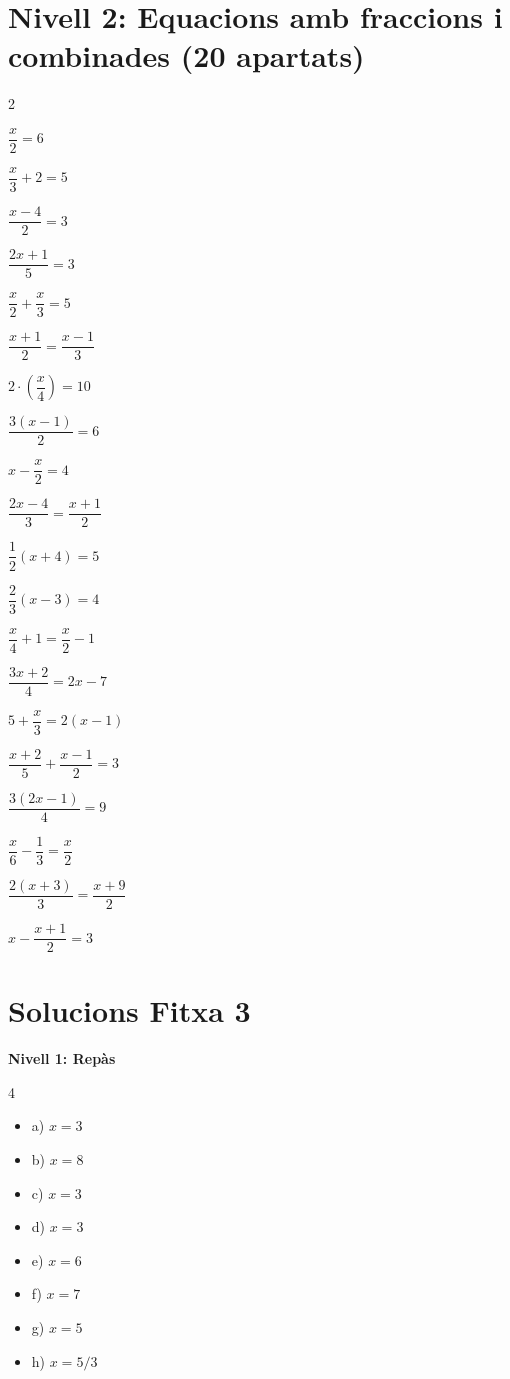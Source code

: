 \documentclass[12pt,a4paper]{article}
\begin{document}
\section*{Nivell 2: Equacions amb fraccions i combinades (20 apartats)}
\begin{multicols}{2}
\begin{exercicis}
    \item $\dfrac{x}{2} = 6$
    \item $\dfrac{x}{3} + 2 = 5$
    \item $\dfrac{x-4}{2} = 3$
    \item $\dfrac{2x+1}{5} = 3$
    \item $\dfrac{x}{2} + \dfrac{x}{3} = 5$
    \item $\dfrac{x+1}{2} = \dfrac{x-1}{3}$
    \item $2 \cdot \left( \dfrac{x}{4} \right) = 10$
    \item $\dfrac{3(x-1)}{2} = 6$
    \item $x - \dfrac{x}{2} = 4$
    \item $\dfrac{2x-4}{3} = \dfrac{x+1}{2}$
    \item $\dfrac{1}{2}(x+4) = 5$
    \item $\dfrac{2}{3}(x-3) = 4$
    \item $\dfrac{x}{4} + 1 = \dfrac{x}{2} - 1$
    \item $\dfrac{3x+2}{4} = 2x - 7$
    \item $5 + \dfrac{x}{3} = 2(x-1)$
    \item $\dfrac{x+2}{5} + \dfrac{x-1}{2} = 3$
    \item $\dfrac{3(2x-1)}{4} = 9$
    \item $\dfrac{x}{6} - \dfrac{1}{3} = \dfrac{x}{2}$
    \item $\dfrac{2(x+3)}{3} = \dfrac{x+9}{2}$
    \item $x - \dfrac{x+1}{2} = 3$
\end{exercicis}
\end{multicols}

\newpage
\section*{Solucions Fitxa 3}

\textbf{Nivell 1: Repàs}
\begin{multicols}{4}
\begin{itemize}
    \item a) $x = 3$
    \item b) $x = 8$
    \item c) $x = 3$
    \item d) $x = 3$
    \item e) $x = 6$
    \item f) $x = 7$
    \item g) $x = 5$
    \item h) $x = 5/3$
\end{itemize}
\end{multicols}
\end{document}
